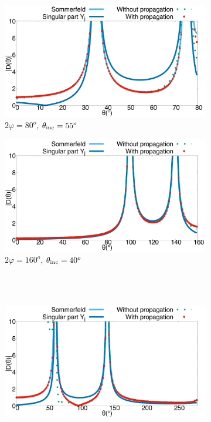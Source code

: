 \begin{figure}[h!]
\centering
\begin{subfigure}[b]{0.49\textwidth}
        \includegraphics[width=\textwidth]{images/chapter2/Figure9a.pdf}
        \caption{$2\varphi = 80^o$, $\theta_{\rm inc} = 55^o$}
        \label{chapter5:figure13a}
    \end{subfigure}
\begin{subfigure}[b]{0.49\textwidth}
        \includegraphics[width=\textwidth]{images/chapter2/Figure9b.pdf}
        \caption{$2\varphi = 160^o$, $\theta_{\rm inc} = 40^o$}
        \label{chapter5:figure13b}
    \end{subfigure}
\\
~\\
\begin{subfigure}[b]{0.49\textwidth}
        \includegraphics[width=\textwidth]{images/chapter2/Figure9c.pdf}

\end{subfigure}
\end{figure}
